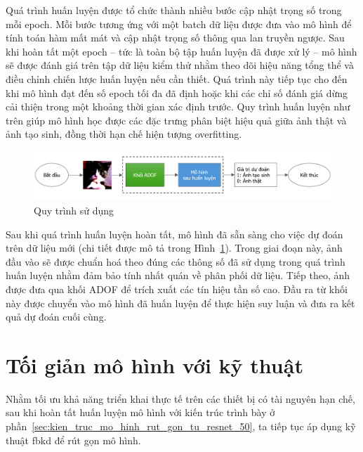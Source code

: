 Quá trình huấn luyện được tổ chức thành nhiều bước cập nhật trọng số trong mỗi \gls{epoch}. Mỗi bước tương ứng với một \gls{batch} dữ liệu được đưa vào mô hình để tính toán hàm mất mát và cập nhật trọng số thông qua lan truyền ngược. Sau khi hoàn tất một \gls{epoch} – tức là toàn bộ tập huấn luyện đã được xử lý – mô hình sẽ được đánh giá trên tập dữ liệu kiểm thử nhằm theo dõi hiệu năng tổng thể và điều chỉnh chiến lược huấn luyện nếu cần thiết. Quá trình này tiếp tục cho đến khi mô hình đạt đến số \gls{epoch} tối đa đã định hoặc khi các chỉ số đánh giá dừng cải thiện trong một khoảng thời gian xác định trước. Quy trình huấn luyện như trên giúp mô hình học được các đặc trưng phân biệt hiệu quả giữa ảnh thật và ảnh tạo sinh, đồng thời hạn chế hiện tượng \gls{overfitting}.
%
%
\begin{figure}[ht!]
	\centering
	\includegraphics[width=1.0\linewidth]{Images/online-serving.png}
	\begin{minipage}{1.0\linewidth}
		\vspace{3mm}
		\caption{Quy trình sử dụng}
		\label{fig:online-serving}
	\end{minipage}
\end{figure}
%
%

Sau khi quá trình huấn luyện hoàn tất, mô hình đã sẵn sàng cho việc dự đoán trên dữ liệu mới (chi tiết được mô tả trong Hình~\ref{fig:online-serving}). Trong giai đoạn này, ảnh đầu vào sẽ được chuẩn hoá theo đúng các thông số đã sử dụng trong quá trình huấn luyện nhằm đảm bảo tính nhất quán về phân phối dữ liệu. Tiếp theo, ảnh được đưa qua khối ADOF để trích xuất các tín hiệu tần số cao. Đầu ra từ khối này được chuyển vào mô hình đã huấn luyện để thực hiện suy luận và đưa ra kết quả dự đoán cuối cùng.

\section{Tối giản mô hình với kỹ thuật }
%
\label{ss:toi_gian_mo_hinh}
%
Nhằm tối ưu khả năng triển khai thực tế trên các thiết bị có tài nguyên hạn chế, sau khi hoàn tất huấn luyện mô hình với kiến trúc trình bày ở phần~\ref{sec:kien_truc_mo_hinh_rut_gon_tu_resnet_50}, ta tiếp tục áp dụng kỹ thuật \gls{fbkd} để rút gọn mô hình.

